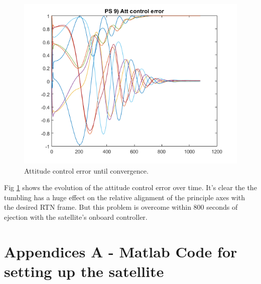 \documentclass[12pt, letterpaper]{article}
\begin{document}
\begin{figure}[H]
	\centering
	\includegraphics[scale=0.8]{ps9_04}
	\caption{Attitude control error until convergence.}
	\label{9:atterror}
\end{figure}

Fig \ref{9:atterror} shows the evolution of the attitude control error over time. It's clear the the tumbling has a huge effect on the relative alignment of the principle axes with the desired RTN frame. But this problem is overcome within 800 seconds of ejection with the satellite's onboard controller.



\section{Appendices A - Matlab Code for setting up the satellite}


\end{document}
